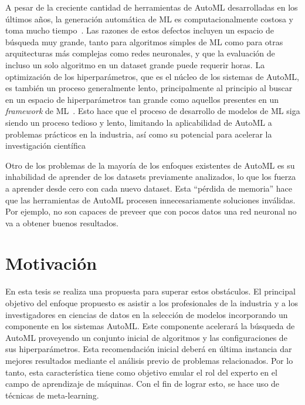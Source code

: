 A pesar de la creciente cantidad de herramientas de AutoML desarrolladas en los últimos años, la generación automática de ML es computacionalmente costosa y toma mucho tiempo~\cite{crisan2021fits}. Las razones de estos defectos incluyen un espacio de búsqueda muy grande, tanto para algoritmos simples de ML como para otras arquitecturas más complejas como redes neuronales, y que la evaluación de incluso un solo algoritmo en un dataset grande puede requerir horas. La optimización de los hiperparámetros, que es el núcleo de los sistemas de AutoML, es también un proceso generalmente lento, principalmente al principio al buscar en un espacio de hiperparámetros tan grande como aquellos presentes en un \textit{framework} de ML~\cite{fuerer2015efficient}. Esto hace que el proceso de desarrollo de modelos de ML siga siendo un proceso tedioso y lento, limitando la aplicabilidad de AutoML a problemas prácticos en la industria, así como su potencial para acelerar la investigación científica

Otro de los problemas de la mayoría de los enfoques existentes de AutoML es su inhabilidad de aprender de los datasets previamente analizados, lo que los fuerza a aprender desde cero con cada nuevo dataset. Esta ``pérdida de memoria'' hace que las herramientas de AutoML procesen innecesariamente soluciones inválidas. Por ejemplo, no son capaces de preveer que con pocos datos una red neuronal no va a obtener buenos resultados. 



\section*{Motivación}

En esta tesis se realiza una propuesta para superar estos obstáculos. El principal objetivo del enfoque propuesto es asistir a los profesionales de la industria y a los investigadores en ciencias de datos en la selección de modelos incorporando un componente en los sistemas AutoML. Este componente acelerará la búsqueda de AutoML proveyendo un conjunto inicial de algoritmos y las configuraciones de sus hiperparámetros. Esta recomendación inicial deberá en última instancia dar mejores resultados mediante el análisis previo de problemas relacionados. Por lo tanto, esta característica tiene como objetivo emular el rol del experto en el campo de aprendizaje de máquinas. Con el fin de lograr esto, se hace uso de técnicas de meta-learning. 

